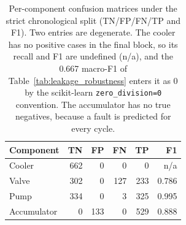 \begin{table}[t]
\centering
\caption{Per-component confusion matrices under the strict chronological split (TN/FP/FN/TP and F1). Two entries are degenerate. The cooler has no positive cases in the final block, so its recall and F1 are undefined (n/a), and the 0.667 macro-F1 of Table~\ref{tab:leakage_robustness} enters it as 0 by the scikit-learn \texttt{zero\_division=0} convention. The accumulator has no true negatives, because a fault is predicted for every cycle.}
\label{tab:confusion}
\begin{tabular}{lrrrrr}
\toprule
Component & TN & FP & FN & TP & F1 \\
\midrule
Cooler & 662 & 0 & 0 & 0 & n/a \\
Valve & 302 & 0 & 127 & 233 & 0.786 \\
Pump & 334 & 0 & 3 & 325 & 0.995 \\
Accumulator & 0 & 133 & 0 & 529 & 0.888 \\
\bottomrule
\end{tabular}
\end{table}
